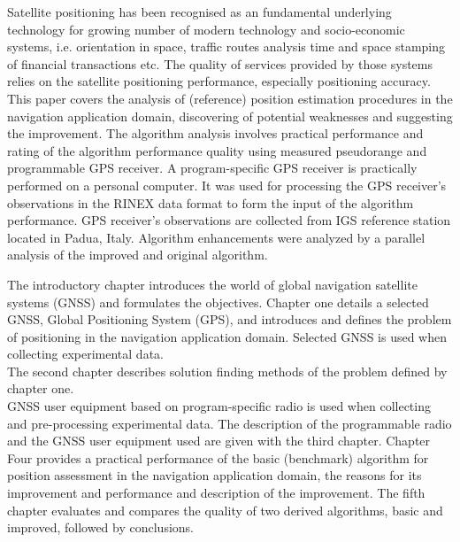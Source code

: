 \documentclass[a4paper,twoside,12pt]{memoir} %
\begin{document}
\begin{summary}
Satellite positioning has been recognised as an fundamental underlying technology for growing number
of modern technology and socio-economic systems, i.e. orientation in space, traffic routes analysis time and space stamping of financial transactions etc. The quality of services provided by those
systems relies on the satellite positioning performance, especially positioning accuracy. 
This paper covers the analysis of (reference) position estimation procedures in the navigation application domain, discovering of potential weaknesses and suggesting the improvement.
The algorithm analysis involves practical performance and rating of the algorithm performance quality using measured pseudorange and programmable GPS receiver.
A program-specific GPS receiver is practically performed on a personal computer. It was used for processing the GPS receiver's observations in the RINEX data format to form the input of the algorithm performance.
GPS receiver's observations are collected from IGS reference station located in Padua, Italy.
Algorithm enhancements were analyzed by a parallel analysis of the improved and original algorithm.

The introductory chapter introduces the world of global navigation satellite systems (GNSS) and formulates the objectives. Chapter one details a selected GNSS, Global Positioning System (GPS), and introduces and defines the problem of positioning in the navigation application domain.
Selected GNSS is used when collecting experimental data. \\
The second chapter describes solution finding methods of the problem defined by chapter one. \\
GNSS user equipment based on program-specific radio is used when collecting and pre-processing experimental data.
The description of the programmable radio and the GNSS user equipment used are given with the third chapter.
Chapter Four provides a practical performance of the basic (benchmark) algorithm for position assessment in the navigation application domain, the reasons for its improvement and performance and description of the improvement.
The fifth chapter evaluates and compares the quality of two derived algorithms, basic and improved, followed by conclusions. 
\end{summary}

\end{document}
